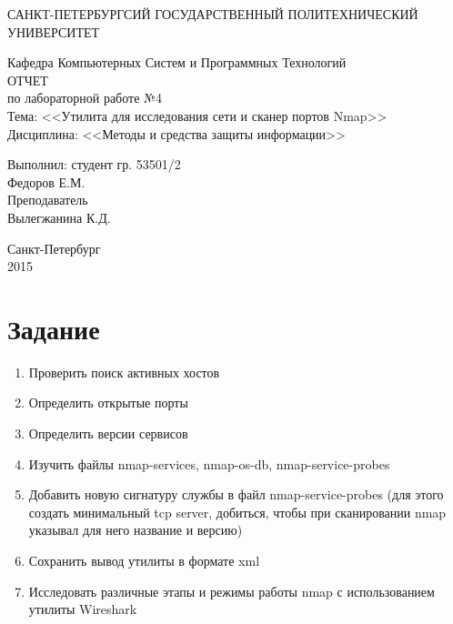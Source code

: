 \documentclass[utf8x, 12pt]{G7-32}
\begin{document}
\frontmatter 


\begin{center} 

\large САНКТ-ПЕТЕРБУРГСИЙ ГОСУДАРСТВЕННЫЙ ПОЛИТЕХНИЧЕСКИЙ УНИВЕРСИТЕТ

\large Кафедра Компьютерных Систем и Программных Технологий \\[5.5cm] 

\huge ОТЧЕТ \\[0.6cm] %
\large по лабораторной работе №4\\
\large Тема: <<Утилита для исследования сети и сканер портов Nmap>>\\
\large Дисциплина: <<Методы и средства защиты информации>>\\[3.7cm]

\end{center} 

\begin{flushright}
Выполнил: студент гр. 53501/2 \\
Федоров Е.М. \\[1.2cm]


Преподаватель \\
Вылегжанина К.Д.
\end{flushright}


\vfill 

\begin{center} 
\large Санкт-Петербург \\
2015
\end{center} 

\thispagestyle{empty}



\thispagestyle{empty}
\setcounter{page}{0}
\tableofcontents
\clearpage
\mainmatter


\chapter{Задание}

\begin{enumerate}
	\item Проверить поиск активных хостов
	\item Определить открытые порты
	\item Определить версии сервисов
	\item Изучить файлы nmap-services, nmap-os-db, nmap-service-probes
	\item Добавить новую сигнатуру службы в файл nmap-service-probes (для этого создать минимальный tcp server, добиться, чтобы при сканировании nmap указывал для него название и версию)
	\item Сохранить вывод утилиты в формате xml
	\item Исследовать различные этапы и режимы работы nmap с использованием утилиты Wireshark
\end{enumerate}
\end{document}
